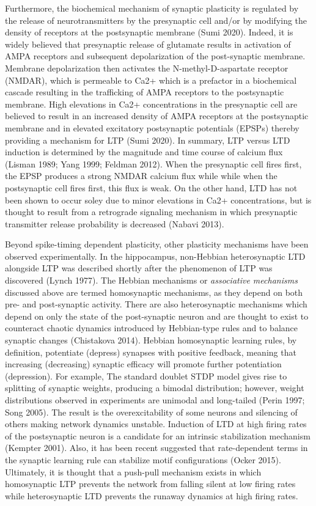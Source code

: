 \documentclass{ucetd}
\begin{document}
Furthermore, the biochemical mechanism of synaptic plasticity is regulated by the release of neurotransmitters by the presynaptic cell and/or by modifying the density of receptors at the postsynaptic membrane (Sumi 2020). Indeed, it is widely believed that presynaptic release of glutamate results in activation of AMPA receptors and subsequent depolarization of the post-synaptic membrane. Membrane depolarization then activates the N-methyl-D-aspartate receptor (NMDAR), which is permeable to Ca2+ which is a prefactor in a biochemical cascade resulting in the trafficking of AMPA receptors to the postsynaptic membrane. High elevations in Ca2+ concentrations in the presynaptic cell are believed to result in an increased density of AMPA receptors at the postsynaptic membrane and in elevated excitatory postsynaptic potentials (EPSPs) thereby providing a mechanism for LTP (Sumi 2020). In summary, LTP versus LTD induction is determined by the magnitude and time course of calcium flux (Lisman 1989; Yang 1999; Feldman 2012). When the presynaptic cell fires first, the EPSP produces a strong NMDAR calcium flux while while when the postsynaptic cell fires first, this flux is weak. On the other hand, LTD has not been shown to occur soley due to minor elevations in Ca2+ concentrations, but is thought to result from a retrograde signaling mechanism in which presynaptic transmitter release probability is decreased (Nabavi 2013).

Beyond spike-timing dependent plasticity, other plasticity mechanisms have been observed experimentally. In the hippocampus, non-Hebbian heterosynaptic LTD alongside LTP was described shortly after the phenomenon of LTP was discovered (Lynch 1977). The Hebbian mechanisms or \emph{associative mechanisms} discussed above are termed homosynaptic mechanisms, as they depend on both pre- and post-synaptic activity. There are also heterosynaptic mechanisms which depend on only the state of the post-synaptic neuron and are thought to exist to counteract chaotic dynamics introduced by Hebbian-type rules and to balance synaptic changes (Chistakova 2014). Hebbian homosynaptic learning rules, by definition, potentiate (depress) synapses with positive feedback, meaning that increasing (decreasing) synaptic efficacy will promote further potentiation (depression). For example, The standard doublet STDP model gives rise to splitting of synaptic weights, producing a bimodal distribution; however, weight distributions observed in experiments are unimodal and long-tailed (Perin 1997; Song 2005). The result is the overexcitability of some neurons and silencing of others making network dynamics unstable. Induction of LTD at high firing rates of the postsynaptic neuron is a candidate for an intrinsic stabilization mechanism (Kempter 2001). Also, it has been recent suggested that rate-dependent terms in the synaptic learning rule can stabilize motif configurations (Ocker 2015). Ultimately, it is thought that a push-pull mechanism exists in which homosynaptic LTP prevents the network from falling silent at low firing rates while heterosynaptic LTD prevents the runaway dynamics at high firing rates.
\end{document}
